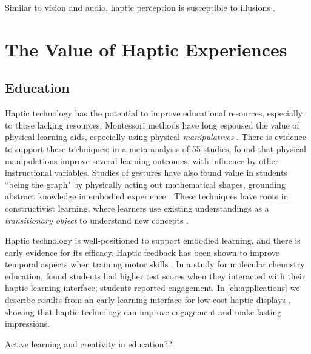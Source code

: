 Similar to vision and audio, haptic perception is susceptible to illusions \cite{Hayward2016,Hayward2008}.


%
%
\section{The Value of Haptic Experiences}


\subsection{Education}
Haptic technology has the potential to improve educational resources, especially to those lacking resources.
Montessori methods have long espoused the value of physical learning aids, especially using physical \emph{manipulatives} \cite{Montessori1917}.
There is evidence to support these techniques: in a meta-analysis of 55 studies, \citet{Carbonneau2013} found that physical manipulations improve several learning outcomes, with influence by other instructional variables.
Studies of gestures have also found value in students ``being the graph" by physically acting out mathematical shapes, grounding abstract knowledge in embodied experience \cite{Gerofsky2010}.
These techniques have roots in constructivist learning, where learners use existing understandings as a \emph{transitionary object} to understand new concepts \cite{Papert1980}.

Haptic technology is well-positioned to support embodied learning, and there is early evidence for its efficacy.
Haptic feedback has been shown to improve temporal aspects when training motor skills \cite{Feygin2002}.
In a study for molecular chemistry education, \citet{Sato2008} found students had higher test scores when they interacted with their haptic learning interface; students reported engagement.
In \autoref{ch:applications} we describe results from an early learning interface for low-cost haptic displays \cite{Martinez2016}, showing that haptic technology can improve engagement and make lasting impressions.

Active learning and creativity in education??

